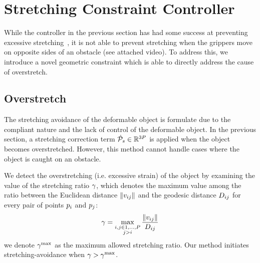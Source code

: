 
\section{Stretching Constraint Controller}
\label{sec:stretching_constraint_controller}



While the controller in the previous section has had some success at preventing excessive stretching~\cite{Berenson2013}, it is not able to prevent stretching when the grippers move on opposite sides of an obstacle (see attached video). To address this, we introduce a novel geometric constraint which is able to directly address the cause of overstretch.

\subsection{Overstretch}
\label{Method_Overstretch}
The stretching avoidance of the deformable object is formulate due to the compliant nature and the lack of control of the deformable object. In the previous section, a stretching correction term $\dot{\mathcal{P}}_s \in \mathbb{R}^{3P}$ is applied when the object becomes overstretched. However, this method cannot handle cases where the object is caught on an obstacle.

We detect the overstretching (i.e. excessive strain) of the object by examining the value of the stretching ratio $\gamma$, which denotes the maximum value among the ratio between the Euclidean distance $\| v_{i j} \|$ and the geodesic distance $D_{i j}$ for every pair of points $p_i$ and $p_j$:
\begin{equation}
    \gamma = \max_{\substack{i, j \in 1, \dots, P \\ j > i}} \frac{\| v_{i j} \|}{D_{i j}}
    \label{Eq:Method_stretching_detection}
\end{equation}
we denote $\gamma^{\textrm{max}}$ as the maximum allowed stretching ratio. Our method initiates stretching-avoidance when $\gamma > \gamma^{\textrm{max}}$.

